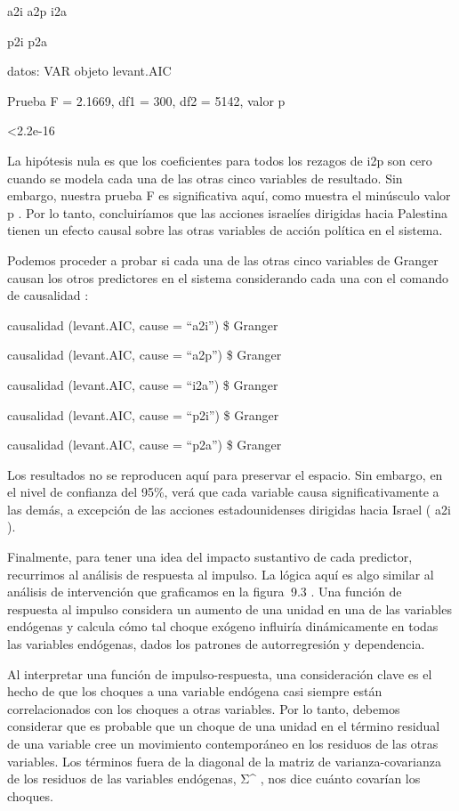 \documentclass[
]{book}
\begin{document}
a2i a2p i2a

p2i p2a

datos: VAR objeto levant.AIC

Prueba F = 2.1669, df1 = 300, df2 = 5142, valor p

\textless2.2e-16

La hipótesis nula es que los coeficientes para todos los rezagos de i2p son cero cuando se modela cada una de las otras cinco variables de resultado. Sin embargo, nuestra prueba F es significativa aquí, como muestra el minúsculo valor p . Por lo tanto, concluiríamos que las acciones israelíes dirigidas hacia Palestina tienen un efecto causal sobre las otras variables de acción política en el sistema.

Podemos proceder a probar si cada una de las otras cinco variables de Granger causan los otros predictores en el sistema considerando cada una con el comando de causalidad :

causalidad (levant.AIC, cause = ``a2i'') \$ Granger

causalidad (levant.AIC, cause = ``a2p'') \$ Granger

causalidad (levant.AIC, cause = ``i2a'') \$ Granger

causalidad (levant.AIC, cause = ``p2i'') \$ Granger

causalidad (levant.AIC, cause = ``p2a'') \$ Granger

Los resultados no se reproducen aquí para preservar el espacio. Sin embargo, en el nivel de confianza del 95\%, verá que cada variable causa significativamente a las demás, a excepción de las acciones estadounidenses dirigidas hacia Israel ( a2i ).

Finalmente, para tener una idea del impacto sustantivo de cada predictor, recurrimos al análisis de respuesta al impulso. La lógica aquí es algo similar al análisis de intervención que graficamos en la figura  9.3 . Una función de respuesta al impulso considera un aumento de una unidad en una de las variables endógenas y calcula cómo tal choque exógeno influiría dinámicamente en todas las variables endógenas, dados los patrones de autorregresión y dependencia.

Al interpretar una función de impulso-respuesta, una consideración clave es el hecho de que los choques a una variable endógena casi siempre están correlacionados con los choques a otras variables. Por lo tanto, debemos considerar que es probable que un choque de una unidad en el término residual de una variable cree un movimiento contemporáneo en los residuos de las otras variables. Los términos fuera de la diagonal de la matriz de varianza-covarianza de los residuos de las variables endógenas, Σ\^{} , nos dice cuánto covarían los choques.
\end{document}
